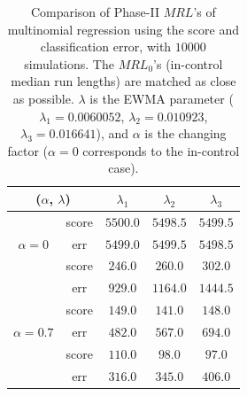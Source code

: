 \documentclass[twoside,11pt]{article}
\begin{document}
\begin{appendix}
\begin{table}[H]
\centering
\begin{tabular}{ccccc}
\toprule
\multicolumn{2}{c}{($ \alpha$, $ \lambda$)} & $ \lambda_1$ & $ \lambda_2$ & $ \lambda_3$ \\
\midrule
\multirow{3}{*}{$\alpha=0$} & score &$5500.0$ & $5498.5$ & $5499.5$ \\
& err &$5499.0$ & $5499.5$ & $5498.5$ \\
\midrule
\multirow{3}{*}{$\alpha=0.5$} & score &$\bm{246.0}$ & $\bm{260.0}$ & $\bm{302.0}$ \\
& err &$929.0$ & $1164.0$ & $1444.5$ \\
\midrule
\multirow{3}{*}{$\alpha=0.7$} & score &$\bm{149.0}$ & $\bm{141.0}$ & $\bm{148.0}$ \\
& err &$482.0$ & $567.0$ & $694.0$ \\
\midrule
\multirow{3}{*}{$\alpha=0.9$} & score &$\bm{110.0}$ & $\bm{98.0}$ & $\bm{97.0}$ \\
& err &$316.0$ & $345.0$ & $406.0$ \\
\midrule
\end{tabular}
\caption{Comparison of Phase-II $MRL$'s of multinomial regression using the score and classification error, with $10000$ simulations. The $MRL_0$'s (in-control median run lengths) are matched as close as possible. $ \lambda$ is the EWMA parameter ({$ \lambda_1 = 0.0060052$}, {$ \lambda_2 = 0.010923$}, {$ \lambda_3 = 0.016641$}), and $ \alpha$ is the changing factor ($ \alpha=0$ corresponds to the in-control case).}
\label{tab:multi_logi_MRL}
\end{table}



\end{appendix}
\end{document}
